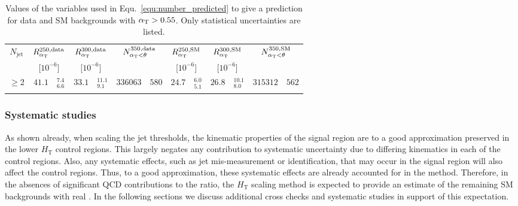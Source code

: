 \medskip
\begin{table}[!h]
  \begin{center}
    \caption{\label{tab:numbers_prediction} Values of the variables used
      in Equ.~\ref{equ:number_predicted} to give a prediction for data
      and SM backgrounds with $\alpha_{\mathrm{T}} > 0.55$. Only statistical
      uncertainties are listed.}
    \begin{tabular}{cr@{$\ \pm\ $}lr@{$\ \pm\ $}lr@{$\ \pm\ $}lr@{$\ \pm\ $}lr@{$\ \pm\ $}lr@{$\ \pm\ $}l}
      \hline\noalign{\smallskip}
      $N_{\mathrm{jet}}$ &
      \multicolumn{2}{c}{$R^{250,\mathrm{data}}_{\alpha_{\mathrm{T}}}$} &
      \multicolumn{2}{c}{$R^{300,\mathrm{data}}_{\alpha_{\mathrm{T}}}$} &
      \multicolumn{2}{c}{$N^{350,\mathrm{data}}_{\alpha_{\mathrm{T}}<\theta}$} &
      \multicolumn{2}{c}{$R^{250,\mathrm{SM}}_{\alpha_{\mathrm{T}}}$} &
      \multicolumn{2}{c}{$R^{300,\mathrm{SM}}_{\alpha_{\mathrm{T}}}$} &
      \multicolumn{2}{c}{$N^{350,\mathrm{SM}}_{\alpha_{\mathrm{T}}<\theta}$} \\
      &
      \multicolumn{2}{c}{[$10^{-6}$]} &
      \multicolumn{2}{c}{[$10^{-6}$]} &
      \multicolumn{2}{c}{} &
      \multicolumn{2}{c}{[$10^{-6}$]} &
      \multicolumn{2}{c}{[$10^{-6}$]} &
      \multicolumn{2}{c}{} \\
      \noalign{\smallskip}\hline\noalign{\smallskip}
      $\geq$2 & 
      $41.1$&$^{7.4}_{6.6}$ & 
      $33.1$&$^{11.1}_{9.1}$ & 
      $336063$&$580$ & 
      $24.7$&$^{6.0}_{5.1}$ & 
      $26.8$&$^{10.1}_{8.0}$ & 
      $315312$&$562$ \\
      \noalign{\smallskip}\hline
    \end{tabular}
  \end{center}
\end{table}

\subsubsection{Systematic studies}

As shown already, when scaling the jet \pt thresholds, the kinematic
properties of the signal region are to a good approximation preserved in
the lower $H_{\mathrm{T}}$ control regions.  This largely negates any
contribution to systematic uncertainty due to differing kinematics in
each of the control regions. Also, any systematic effects, such as jet
mis-measurement or identification, that may occur in the signal region
will also affect the control regions. Thus, to a good approximation,
these systematic effects are already accounted for in the
method. Therefore, in the absences of significant QCD contributions to
the ratio, the $H_{\mathrm{T}}$ scaling method is expected to provide an estimate
of the remaining SM backgrounds with real \mymet. In the following
sections we discuss additional cross checks and systematic studies in
support of this expectation.

